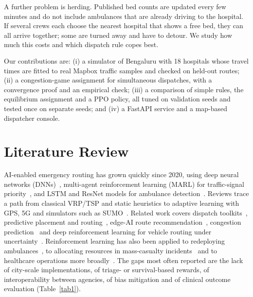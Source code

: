\documentclass[conference]{IEEEtran}
\begin{document}
A further problem is herding. Published bed counts are updated every few minutes and do not include ambulances that are already driving to the hospital. If several crews each choose the nearest hospital that shows a free bed, they can all arrive together; some are turned away and have to detour. We study how much this costs and which dispatch rule copes best.

Our contributions are: (i) a simulator of Bengaluru with 18 hospitals whose travel times are fitted to real Mapbox traffic samples and checked on held-out routes; (ii) a congestion-game assignment for simultaneous dispatches, with a convergence proof and an empirical check; (iii) a comparison of simple rules, the equilibrium assignment and a PPO policy, all tuned on validation seeds and tested once on separate seeds; and (iv) a FastAPI service and a map-based dispatcher console.

\section{Literature Review}
AI-enabled emergency routing has grown quickly since 2020, using deep neural networks (DNNs)~\cite{selvan2025ambulance}, multi-agent reinforcement learning (MARL) for traffic-signal priority~\cite{olusanya2025multi}, and LSTM and ResNet models for ambulance detection~\cite{alruwaili2025lstm}. Reviews trace a path from classical VRP/TSP and static heuristics to adaptive learning with GPS, 5G and simulators such as SUMO~\cite{bajwa2025ai,tluli2024survey}. Related work covers dispatch toolkits~\cite{mappouras2025toolkit}, predictive placement and routing~\cite{nahata2024optimising}, edge-AI route recommendation~\cite{ahmed2023edge}, congestion prediction~\cite{pratyusha2025edge} and deep reinforcement learning for vehicle routing under uncertainty~\cite{kadyrov2025deep}. Reinforcement learning has also been applied to redeploying ambulances~\cite{tluli2024dynamic}, to allocating resources in mass-casualty incidents~\cite{murare2025abms} and to healthcare operations more broadly~\cite{wu2025reinforcement}. The gaps most often reported are the lack of city-scale implementations, of triage- or survival-based rewards, of interoperability between agencies, of bias mitigation and of clinical outcome evaluation (Table~\ref{tab1}).
\end{document}
